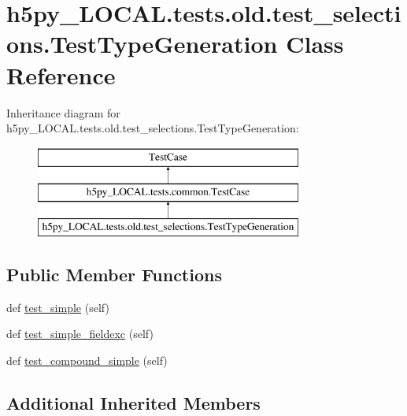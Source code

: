 \hypertarget{classh5py__LOCAL_1_1tests_1_1old_1_1test__selections_1_1TestTypeGeneration}{}\section{h5py\+\_\+\+L\+O\+C\+A\+L.\+tests.\+old.\+test\+\_\+selections.\+Test\+Type\+Generation Class Reference}
\label{classh5py__LOCAL_1_1tests_1_1old_1_1test__selections_1_1TestTypeGeneration}
Inheritance diagram for h5py\+\_\+\+L\+O\+C\+A\+L.\+tests.\+old.\+test\+\_\+selections.\+Test\+Type\+Generation\+:\begin{figure}[H]
\begin{center}
\leavevmode
\includegraphics[height=3.000000cm]{classh5py__LOCAL_1_1tests_1_1old_1_1test__selections_1_1TestTypeGeneration}
\end{center}
\end{figure}
\subsection*{Public Member Functions}
\begin{DoxyCompactItemize}
\item 
def \hyperlink{classh5py__LOCAL_1_1tests_1_1old_1_1test__selections_1_1TestTypeGeneration_a198f768d210c91190384bad11e17dcd4}{test\+\_\+simple} (self)
\item 
def \hyperlink{classh5py__LOCAL_1_1tests_1_1old_1_1test__selections_1_1TestTypeGeneration_ae508c72b7d08370c3289e2954d68a4b8}{test\+\_\+simple\+\_\+fieldexc} (self)
\item 
def \hyperlink{classh5py__LOCAL_1_1tests_1_1old_1_1test__selections_1_1TestTypeGeneration_a598f490b8b9e6638ad0b70e93825aec9}{test\+\_\+compound\+\_\+simple} (self)
\end{DoxyCompactItemize}
\subsection*{Additional Inherited Members}


